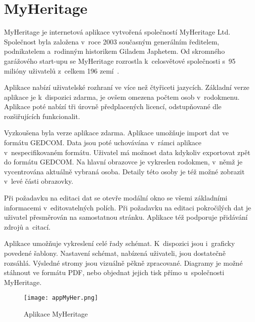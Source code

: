 		\section{MyHeritage}
		\label{ssec:myher}
		MyHeritage je internetová aplikace vytvořená společností MyHeritage Ltd. Společnost byla založena v~roce 2003 současným generálním ředitelem, podnikatelem a~rodinným historikem Giladem Japhetem. Od skromného garážového start-upu se MyHeritage rozrostla k~celosvětové společnosti s~95 milióny uživatelů z~celkem 196 zemí~\cite{bib:ApliMyHer}.\par
		Aplikace nabízí uživatelské rozhraní ve více než čtyřiceti jazycích. Základní verze aplikace je k~dispozici zdarma, je ovšem omezena počtem osob v~rodokmenu. Aplikace poté nabízí tři úrovně předplacených licencí, odstupňované dle rozšiřujících funkcionalit.\par
		Vyzkoušena byla verze aplikace zdarma. Aplikace umožňuje import dat ve formátu GEDCOM. Data jsou poté uchovávána v~rámci aplikace v~nespecifikovaném formátu. Uživatel má možnost data kdykoliv exportovat zpět do formátu GEDCOM.
		Na hlavní obrazovce je vykreslen rodokmen, v~němž je vycentrována aktuálně vybraná osoba. Detaily této osoby je též možné zobrazit v~levé části obrazovky.\par
		Při požadavku na editaci dat se otevře modální okno se všemi základními informacemi v~editovatelných polích. Při požadavku na editaci pokročilých dat je uživatel přesměrován na samostatnou stránku. Aplikace též podporuje přidávání zdrojů a~citací.\par
		Aplikace umožňuje vykreslení celé řady schémat. K~dispozici jsou i~graficky povedené šablony. Nastavení schémat, nabízená uživateli, jsou dostatečně rozsáhlá. Výsledné stromy jsou vizuálně pěkně zpracované. Diagramy je možné stáhnout ve formátu PDF, nebo objednat jejich tisk přímo u~společnosti MyHeritage.\par
		\begin{figure}[H]
			\centering
			\texttt{[image: appMyHer.png]}
			\caption{Aplikace MyHeritage}
			\label{fig:appMyHer}
		\end{figure}
		
